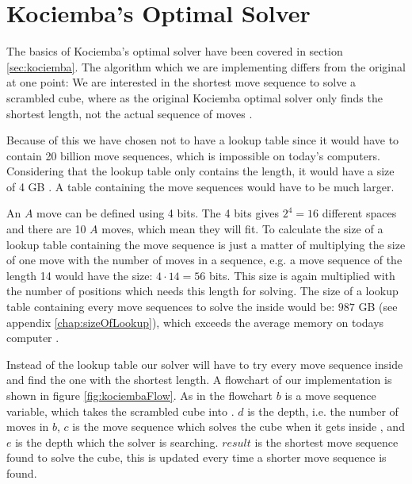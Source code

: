 \chapter{Kociemba's Optimal Solver}
\label{chap:kociembaImplement}
The basics of Kociemba's optimal solver have been covered in section \ref{sec:kociemba}. The algorithm which we are implementing differs from the original at one point:
We are interested in the shortest move sequence to solve a scrambled cube, where as the original Kociemba optimal solver only finds the shortest length, not the actual sequence of moves \cite{rokicki09}.

Because of this we have chosen not to have a lookup table since it would have to contain 20 billion move sequences, which is impossible on today's computers. Considering that the lookup table only contains the length, it would have a size of 4 GB \cite{cubeExplorer}. A table containing the move sequences would have to be much larger.

An $A$ move can be defined using 4 bits.
The 4 bits gives $2^4=16$ different spaces and there are 10 $A$ moves, which mean they will fit.
To calculate the size of a lookup table containing the move sequence is just a matter of multiplying the size of one move with the number of moves in a sequence, e.g. a move sequence of the length 14 would have the size: $4 \cdot 14 = 56$ bits.
This size is again multiplied with the number of positions which needs this length for solving.
The size of a lookup table containing every move sequences to solve the \rubik{} inside  would be: $987$ GB (see appendix \ref{chap:sizeOfLookup}), which exceeds the average memory on todays computer \cite{averageRAM} \cite{maxRAM2}.

Instead of the lookup table our solver will have to try every move sequence inside  and find the one with the shortest length. A flowchart of our implementation is shown in figure \ref{fig:kociembaFlow}.  As in the flowchart $b$ is a move sequence variable, which takes the scrambled cube into . $d$ is the depth, i.e. the number of moves in $b$, $c$ is the move sequence which solves the cube when it gets inside , and $e$ is the depth which the  solver is searching. $result$ is the shortest move sequence found to solve the cube, this is updated every time a shorter move sequence is found.


